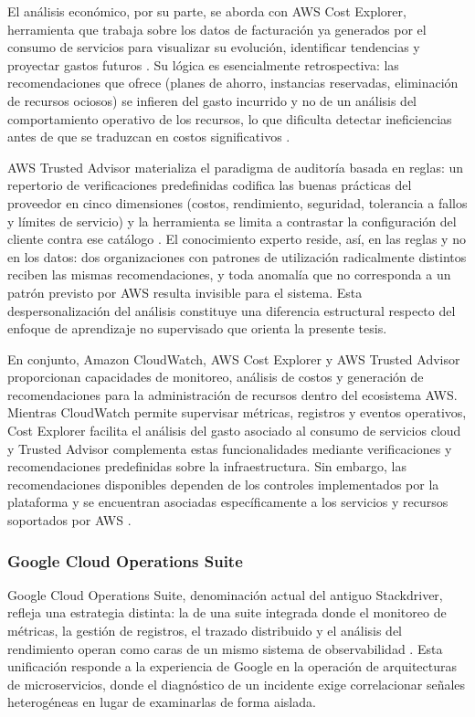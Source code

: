El análisis económico, por su parte, se aborda con AWS Cost Explorer, herramienta que trabaja sobre los datos de facturación ya generados por el consumo de servicios para visualizar su evolución, identificar tendencias y proyectar gastos futuros \parencite{AWS2026}. Su lógica es esencialmente retrospectiva: las recomendaciones que ofrece (planes de ahorro, instancias reservadas, eliminación de recursos ociosos) se infieren del gasto incurrido y no de un análisis del comportamiento operativo de los recursos, lo que dificulta detectar ineficiencias antes de que se traduzcan en costos significativos \parencite{AWS2026}.

AWS Trusted Advisor materializa el paradigma de auditoría basada en reglas: un repertorio de verificaciones predefinidas codifica las buenas prácticas del proveedor en cinco dimensiones (costos, rendimiento, seguridad, tolerancia a fallos y límites de servicio) y la herramienta se limita a contrastar la configuración del cliente contra ese catálogo \parencite{AWS2026}. El conocimiento experto reside, así, en las reglas y no en los datos: dos organizaciones con patrones de utilización radicalmente distintos reciben las mismas recomendaciones, y toda anomalía que no corresponda a un patrón previsto por AWS resulta invisible para el sistema. Esta despersonalización del análisis constituye una diferencia estructural respecto del enfoque de aprendizaje no supervisado que orienta la presente tesis.

En conjunto, Amazon CloudWatch, AWS Cost Explorer y AWS Trusted Advisor proporcionan capacidades de monitoreo, análisis de costos y generación de recomendaciones para la administración de recursos dentro del ecosistema AWS. Mientras CloudWatch permite supervisar métricas, registros y eventos operativos, Cost Explorer facilita el análisis del gasto asociado al consumo de servicios cloud y Trusted Advisor complementa estas funcionalidades mediante verificaciones y recomendaciones predefinidas sobre la infraestructura. Sin embargo, las recomendaciones disponibles dependen de los controles implementados por la plataforma y se encuentran asociadas específicamente a los servicios y recursos soportados por AWS \parencite{AWS2026}.

\subsubsection{Google Cloud Operations Suite}

Google Cloud Operations Suite, denominación actual del antiguo Stackdriver, refleja una estrategia distinta: la de una suite integrada donde el monitoreo de métricas, la gestión de registros, el trazado distribuido y el análisis del rendimiento operan como caras de un mismo sistema de observabilidad \parencite{GoogleCloud2026}. Esta unificación responde a la experiencia de Google en la operación de arquitecturas de microservicios, donde el diagnóstico de un incidente exige correlacionar señales heterogéneas en lugar de examinarlas de forma aislada.

